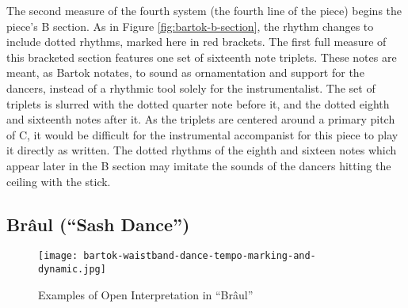 The second measure of the fourth system (the fourth line of the piece) begins the piece's B section. As in Figure \ref{fig:bartok-b-section}\autocite{Lung_2016}, the rhythm changes to include dotted rhythms, marked here in red brackets. The first full measure of this bracketed section features one set of sixteenth note triplets. These notes are meant, as Bartok notates, to sound as ornamentation and support for the dancers, instead of a rhythmic tool solely for the instrumentalist. The set of triplets is slurred with the dotted quarter note before it, and the dotted eighth and sixteenth notes after it. As the triplets are centered around a primary pitch of C, it would be difficult for the instrumental accompanist for this piece to play it directly as written. The dotted rhythms of the eighth and sixteen notes which appear later in the B section may imitate the sounds of the dancers hitting the ceiling with the stick.

\subsection{Brâul (``Sash Dance'')}

\begin{figure}
  \centering
  \texttt{[image: bartok-waistband-dance-tempo-marking-and-dynamic.jpg]}
  \caption[An example of the open interpretation in ``Brâul'' of Bartok's \textit{Six Romanian Folk Dances}, Sz. 56, BB 68]{Examples of Open Interpretation in ``Brâul''}
  \label{fig:bartok-waistband-dance-interpretation}
\end{figure}

